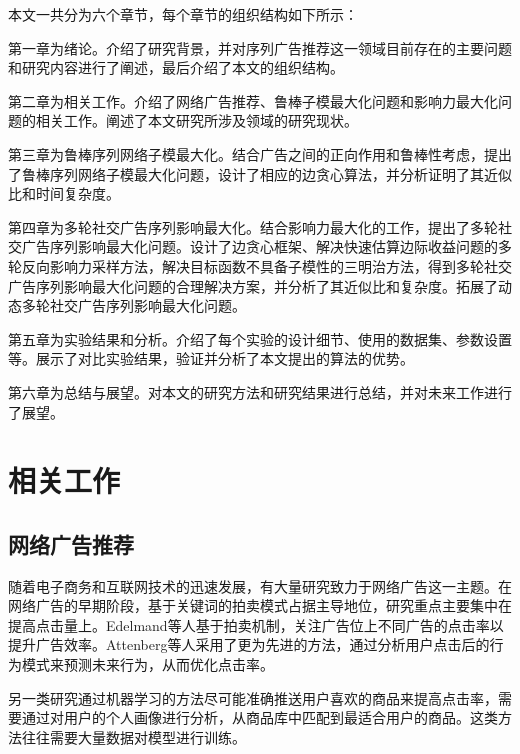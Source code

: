 本文一共分为六个章节，每个章节的组织结构如下所示：

第一章为绪论。介绍了研究背景，并对序列广告推荐这一领域目前存在的主要问题和研究内容进行了阐述，最后介绍了本文的组织结构。

第二章为相关工作。介绍了网络广告推荐、鲁棒子模最大化问题和影响力最大化问题的相关工作。阐述了本文研究所涉及领域的研究现状。

第三章为鲁棒序列网络子模最大化。结合广告之间的正向作用和鲁棒性考虑，提出了鲁棒序列网络子模最大化问题，设计了相应的边贪心算法，并分析证明了其近似比和时间复杂度。

第四章为多轮社交广告序列影响最大化。结合影响力最大化的工作，提出了多轮社交广告序列影响最大化问题。设计了边贪心框架、解决快速估算边际收益问题的多轮反向影响力采样方法，解决目标函数不具备子模性的三明治方法，得到多轮社交广告序列影响最大化问题的合理解决方案，并分析了其近似比和复杂度。拓展了动态多轮社交广告序列影响最大化问题。

第五章为实验结果和分析。介绍了每个实验的设计细节、使用的数据集、参数设置等。展示了对比实验结果，验证并分析了本文提出的算法的优势。

第六章为总结与展望。对本文的研究方法和研究结果进行总结，并对未来工作进行了展望。



\chapter{相关工作}

\section{网络广告推荐}
\label{sec:2_1}

随着电子商务和互联网技术的迅速发展，有大量研究致力于网络广告这一主题。在网络广告的早期阶段，基于关键词的拍卖模式占据主导地位，研究重点主要集中在提高点击量上。Edelmand等人\cite{edelman2007internet}基于拍卖机制，关注广告位上不同广告的点击率以提升广告效率。Attenberg等人\cite{attenberg2009modeling}采用了更为先进的方法，通过分析用户点击后的行为模式来预测未来行为，从而优化点击率。

另一类研究通过机器学习的方法尽可能准确推送用户喜欢的商品来提高点击率\cite{Cai2021,li2021effective}，需要通过对用户的个人画像进行分析，从商品库中匹配到最适合用户的商品。这类方法往往需要大量数据对模型进行训练。

